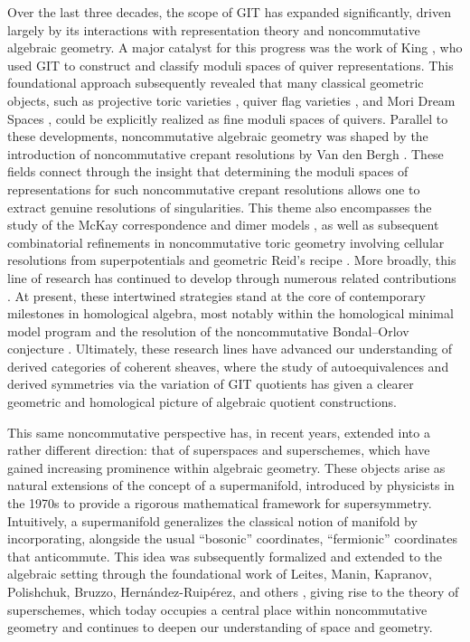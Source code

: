 \documentclass[11pt,a4paper,reqno,noamsfonts]{amsart}
\numberwithin{equation}{section}
\theoremstyle{definition}
\theoremstyle{remark}
\begin{document}
Over the last three decades, the scope of GIT has expanded significantly, driven largely by its interactions with representation theory and noncommutative algebraic geometry. A major catalyst for this progress was the work of King \cite{King1994}, who used GIT to construct and classify moduli spaces of quiver representations. This foundational approach subsequently revealed that many classical geometric objects, such as projective toric varieties \cite{CrawSmith2008}, quiver flag varieties \cite{Craw2011}, and Mori Dream Spaces \cite{CrawWinn2013}, could be explicitly realized as fine moduli spaces of quivers. Parallel to these developments, noncommutative algebraic geometry was shaped by the introduction of noncommutative crepant resolutions by Van den Bergh \cite{VanDenBergh2004, VanDenBergh2004NCCR}. These fields connect through the insight that determining the moduli spaces of representations for such noncommutative crepant resolutions allows one to extract genuine resolutions of singularities. This theme also encompasses the study of the McKay correspondence \cite{CassensSlodowy1998, CrawIshii2004} and dimer models \cite{IshiiUeda2015}, as well as subsequent combinatorial refinements in noncommutative toric geometry involving cellular resolutions from superpotentials \cite{CrawQuinteroVelez2012} and geometric Reid's recipe \cite{BocklandtCrawQuinteroVelez2015}. More broadly, this line of research has continued to develop through numerous related contributions \cite{hoskins2018parallels,hoskins2018stratifications, craw2018multigraded,bellamy2020birational,craw2021punctual,bellamy2026birational}. At present, these intertwined strategies stand at the core of contemporary milestones in homological algebra, most notably within the homological minimal model program \cite{Wemyss2018} and the resolution of the noncommutative Bondal--Orlov conjecture \cite{IyamaWemyss2013}. Ultimately, these research lines have advanced our understanding of derived categories of coherent sheaves, where the study of autoequivalences and derived symmetries via the variation of GIT quotients \cite{HalpernLeistner2015, HalpernLeistnerShipman2016, BallardFaveroKatzarkov2019} has given a clearer geometric and homological picture of algebraic quotient constructions.

This same noncommutative perspective has, in recent years, extended into a rather different direction: that of superspaces and superschemes, which have gained increasing prominence within algebraic geometry. These objects arise as natural extensions of the concept of a supermanifold, introduced by physicists in the 1970s to provide a rigorous mathematical framework for supersymmetry. Intuitively, a supermanifold generalizes the classical notion of manifold by incorporating, alongside the usual ``bosonic'' coordinates, ``fermionic'' coordinates that anticommute. This idea was subsequently formalized and extended to the algebraic setting through the foundational work of Leites, Manin, Kapranov, Polishchuk, Bruzzo, Hernández-Ruipérez, and others \cite{Leites1974,Manin1988,Manin1991,KapranovVasserot2011,BruzzoHernandezRuiperezPolishchuk2023}, giving rise to the theory of superschemes, which today occupies a central place within noncommutative geometry and continues to deepen our understanding of space and geometry.
\end{document}
